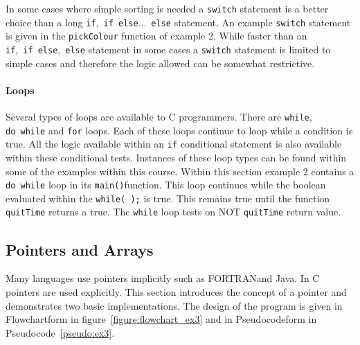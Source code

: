 \documentclass[11pt]{scrartcl}
\def\main{\texttt{main()}}
\def\psc{Pseudocode}
\def\flo{Flowchart}
\def\fortran{FORTRAN}
\begin{document}
In some cases where simple sorting is needed a \texttt{switch}
statement is a better choice than a long
\texttt{if},~\texttt{if~else}...~\texttt{else} statement.  An example
\texttt{switch} statement is given in the \texttt{pickColour} function
of example 2.  While faster than an
\texttt{if},~\texttt{if~else},~\texttt{else} statement in some cases a
\texttt{switch} statement is limited to simple cases and therefore the
logic allowed can be somewhat restrictive.

\paragraph{Loops}
Several types of loops are available to C programmers.  There are
\texttt{while}, \texttt{do~while} and \texttt{for} loops.  Each of
these loops continue to loop while a condition is true.  All the logic
available within an \texttt{if} conditional statement is also
available within these conditional tests.  Instances of these loop
types can be found within some of the examples within this course.
Within this section example 2 contains a \texttt{do~while} loop in its
\main function.  This loop continues while
the boolean evaluated within the \texttt{while(~);} is true.  This
remains true until the function \texttt{quitTime} returns a true.  The
\texttt{while} loop tests on NOT \texttt{quitTime} return value.

\subsection{Pointers and Arrays \label{section:pointersarrays}}

Many languages use pointers implicitly such as \fortran and Java.  In
C pointers are used explicitly.  This section introduces the concept
of a pointer and demonstrates two basic implementations.  The design
of the program is given in \flo form in
figure~\ref{figure:flowchart_ex3} and in \psc form in
\psc~\ref{pseudo:ex3}.
\end{document}

